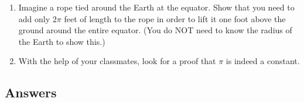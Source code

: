 \documentclass{ximera}
\begin{document}
\begin{enumerate}

\setcounter{enumi}{\value{HW}}

\item Imagine a rope tied around the Earth at the equator.  Show that you need to add only $2\pi$ feet of length to the rope in order to lift it one foot above the ground around the entire equator.  (You do NOT need to know the radius of the Earth to show this.)

\item With the help of your classmates, look for a proof that $\pi$ is indeed a constant.

\end{enumerate}

\newpage

\subsection{Answers}
\end{document}
